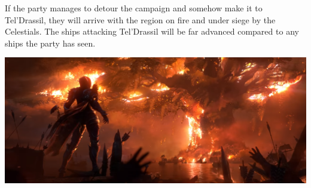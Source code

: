 If the party manages to detour the campaign and somehow make it to Tel'Drassil, they will arrive with the region on fire and under siege by the Celestials. The ships attacking Tel'Drassil will be far advanced compared to any ships the party has seen.

\begin{center}
	\includegraphics[width=\linewidth]{img/WoW/teldrassil.png}
\end{center}